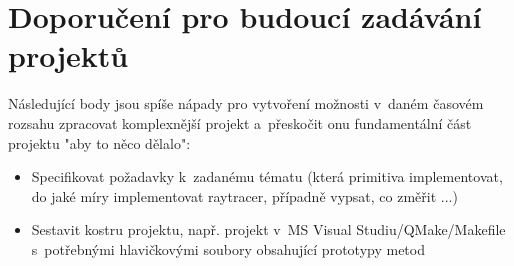 \documentclass[12pt,a4paper,titlepage,final]{report}
\begin{document}
\section{Doporučení pro budoucí zadávání projektů}

Následující body jsou spíše nápady pro vytvoření možnosti v~daném časovém rozsahu zpracovat komplexnější projekt a~přeskočit onu fundamentální část projektu "aby to něco dělalo":
\begin{itemize}
	\item Specifikovat požadavky k~zadanému tématu (která primitiva implementovat, do jaké míry implementovat raytracer, případně vypsat, co změřit ...)
	\item Sestavit kostru projektu, např. projekt v~MS Visual Studiu/QMake/Makefile s~potřebnými hlavičkovými soubory obsahující prototypy metod
\end{itemize}




\nocite{pgr-raytracing}
\nocite{aurelius}
\nocite{pgp-optimalizace}
\nocite{cuda-doc}
\nocite{phong-wiki}
\nocite{so-stack}
\nocite{bvh}
\nocite{cmemory}
\nocite{trier}
\nocite{cite1}
\nocite{cite2}
\nocite{cite3}
\nocite{cite4}
\nocite{STRACHOTA}
\nocite{HART}
\nocite{COOK}
\nocite{STOCHASTIC}
\nocite{FUSSELL}




\end{document}
